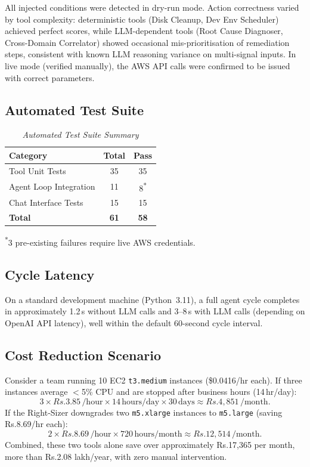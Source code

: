 \documentclass{ieeeaccess}
\begin{document}
All injected conditions were detected in dry-run mode. Action correctness
varied by tool complexity: deterministic tools (Disk Cleanup, Dev Env
Scheduler) achieved perfect scores, while LLM-dependent tools (Root Cause
Diagnoser, Cross-Domain Correlator) showed occasional mis-prioritisation of
remediation steps, consistent with known LLM reasoning variance on
multi-signal inputs. In live mode (verified manually), the AWS API calls
were confirmed to be issued with correct parameters.

\subsection{Automated Test Suite}

\begin{table}[ht]
\caption{\textit{Automated Test Suite Summary}}
\centering
\begin{tabular}{lcc}
\toprule
\textbf{Category} & \textbf{Total} & \textbf{Pass} \\
\midrule
Tool Unit Tests          & 35 & 35 \\
Agent Loop Integration   & 11 & 8\textsuperscript{*} \\
Chat Interface Tests     & 15 & 15 \\
\midrule
\textbf{Total}           & \textbf{61} & \textbf{58} \\
\bottomrule
\end{tabular}
\label{tab:tests}
\end{table}
\textsuperscript{*}3 pre-existing failures require live AWS credentials.

\subsection{Cycle Latency}

On a standard development machine (Python~3.11), a full agent cycle completes
in approximately 1.2\,s without LLM calls and 3--8\,s with LLM calls
(depending on OpenAI API latency), well within the default 60-second cycle
interval.

\subsection{Cost Reduction Scenario}

Consider a team running 10 EC2 \texttt{t3.medium} instances
(\$0.0416/hr each). If three instances average $<$5\% CPU and are stopped
after business hours (14\,hr/day):
\[
3 \times Rs.3.85\,\text{/hour} \times 14\,\text{hours/day} \times 30\,\text{days}
\approx Rs.4,851\,\text{/month}.
\]
If the Right-Sizer downgrades two \texttt{m5.xlarge} instances to
\texttt{m5.large} (saving Rs.8.69/hr each):
\[
2 \times Rs.8.69\,\text{/hour} \times 720\,\text{hours/month}
\approx Rs.12,514\,\text{/month}.
\]
Combined, these two tools alone save over approximately Rs.17,365 per month, more than
Rs.2.08 lakh/year, with zero manual intervention.
\end{document}
